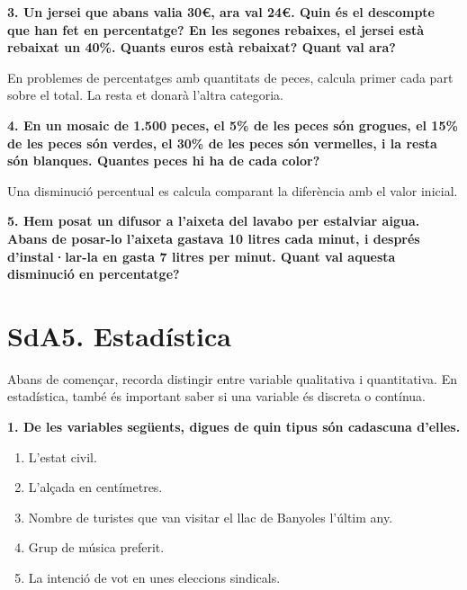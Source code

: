 \documentclass[12pt,a4paper]{article}
\begin{document}
\textbf{3. Un jersei que abans valia 30€, ara val 24€. Quin és el descompte que han fet en percentatge? En les segones rebaixes, el jersei està rebaixat un 40\%. Quants euros està rebaixat? Quant val ara?}

\vspace{3cm}

\begin{capsula}
En problemes de percentatges amb quantitats de peces, calcula primer cada part sobre el total. La resta et donarà l'altra categoria.
\end{capsula}

\textbf{4. En un mosaic de 1.500 peces, el 5\% de les peces són grogues, el 15\% de les peces són verdes, el 30\% de les peces són vermelles, i la resta són blanques. Quantes peces hi ha de cada color?}

\vspace{2.8cm}

\begin{capsula}
Una disminució percentual es calcula comparant la diferència amb el valor inicial.
\end{capsula}

\textbf{5. Hem posat un difusor a l’aixeta del lavabo per estalviar aigua. Abans de posar-lo l’aixeta gastava 10 litres cada minut, i després d’instal·lar-la en gasta 7 litres per minut. Quant val aquesta disminució en percentatge?}

\vspace{2.8cm}

\newpage

\section*{SdA5. Estadística}

\begin{capsula}
Abans de començar, recorda distingir entre variable qualitativa i quantitativa. En estadística, també és important saber si una variable és discreta o contínua.
\end{capsula}

\textbf{1. De les variables següents, digues de quin tipus són cadascuna d’elles.}
\begin{enumerate}[label=\alph*)]
    \item L’estat civil. \vspace{0.2cm}
    \item L’alçada en centímetres. \vspace{0.2cm}
    \item Nombre de turistes que van visitar el llac de Banyoles l’últim any. \vspace{0.2cm}
    \item Grup de música preferit. \vspace{0.2cm}
    \item La intenció de vot en unes eleccions sindicals. \vspace{0.2cm}
\end{enumerate}
\end{document}

